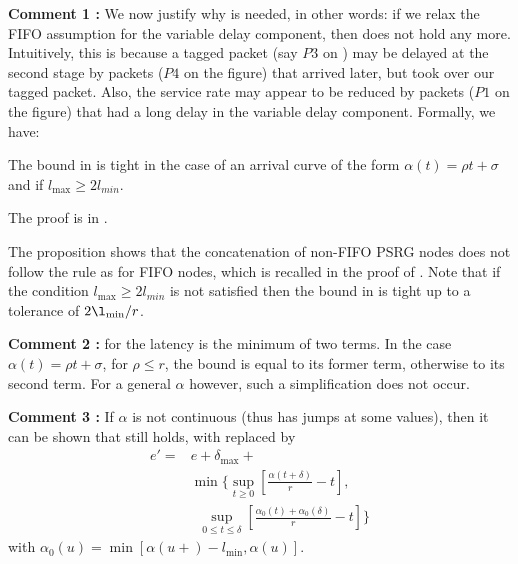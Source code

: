 \textbf{Comment 1 : } We now justify why  is
needed, in other words: if we relax the FIFO assumption for
the variable delay component, then  does not
hold any more. Intuitively, this is because a tagged packet
(say $P3$ on ) may be delayed at the second
stage by packets ($P4$ on the figure) that arrived later, but
took over our tagged packet. Also, the service rate may appear
to be reduced by packets ($P1$ on the figure) that had a long
delay in the variable delay component. Formally, we have:
\begin{proposition}[Tightness] The bound in  is
tight in the case of an arrival curve of the form
$\alpha(t)=\rho t + \sigma$ and if $l_{\max} \geq 2 l_{min}$.
\end{proposition}
The proof is in .

The proposition shows that the concatenation of non-FIFO PSRG
nodes does not follow the rule as for FIFO nodes, which is
recalled in the proof of . Note that if the
condition $l_{\max} \geq 2 l_{min}$ is not satisfied then the
bound in  is tight up to a tolerance of $2
\l_{\min}/r$.

\textbf{Comment 2 : }  for the latency is
the minimum of two terms. In the case $\alpha(t)=\rho t +
\sigma$, for $\rho \leq r$, the bound is equal to its former
term, otherwise to its second term. For a general $\alpha$
however, such a simplification does not occur. 

%
%

\textbf{Comment 3 : }If $\alpha$ is not continuous (thus has
jumps at some values), then it can be shown that
 still holds, with 
replaced by
$$
  \begin{array}{rl}
    e'=  & e+ \delta_{\max} + \\
    & \min \{
  \sup_{t \geq 0}[ \frac{\alpha(t+ \delta) }{r}- t] ,  \\
    &\;\;\sup_{0 \leq t \leq \delta}
  [ \frac{\alpha_0(t)+ \alpha_0(\delta)}{r}- t] \}
  \end{array}
$$
with $\alpha_0(u)=\min[\alpha(u+)- l_{\min}, \alpha(u)]$.

